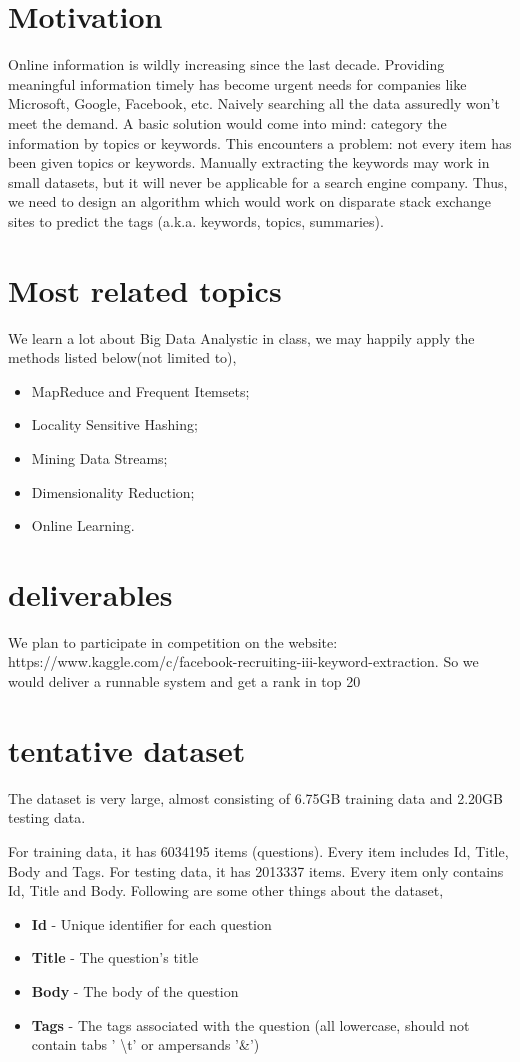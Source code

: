 \documentclass[11pt]{article} %
\begin{document}
\section{Motivation}
Online information is wildly increasing since the last decade. Providing meaningful information timely has become urgent needs for companies like Microsoft, Google, Facebook, etc. Naively searching all the data assuredly won’t meet the demand. A basic solution would come into mind: category the information by topics or keywords. This encounters a problem: not every item has been given topics or keywords. Manually extracting the keywords may work in small datasets, but it will never be applicable for a search engine company. Thus, we need to design an algorithm which would work on disparate stack exchange sites to predict the tags (a.k.a. keywords, topics, summaries).


\section{Most related topics}
We learn a lot about Big Data Analystic in class, we may happily apply the methods listed below(not limited to),
\begin{itemize}
\item MapReduce and Frequent Itemsets;
\item Locality Sensitive Hashing;
\item Mining Data Streams;
\item Dimensionality Reduction;
\item Online Learning.
\end{itemize}
     
\section{deliverables}
We plan to participate in competition on the website: https://www.kaggle.com/c/facebook-recruiting-iii-keyword-extraction. So we would deliver a runnable system and get a rank in top 20

\section{ tentative dataset}
The dataset is very large, almost consisting of 6.75GB training data and 2.20GB testing data.

For training data, it has 6034195 items (questions). Every item includes Id, Title, Body and Tags. For testing data, it has 2013337 items. Every item only contains Id, Title and Body.
Following are some other things about the dataset,
\begin{itemize}
\item \textbf{Id} - Unique identifier for each question
\item \textbf{Title} - The question's title
\item \textbf{Body} - The body of the question
\item \textbf{Tags} - The tags associated with the question (all lowercase, should not contain tabs '
\textbackslash t' or ampersands '\&')
\end{itemize}
\end{document}
